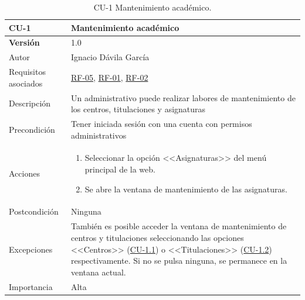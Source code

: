 \begin{table}[p]
	\centering
	\begin{tabularx}{\linewidth}{ p{} p{} }
		\toprule
		\textbf{CU-1}    & \textbf{Mantenimiento académico}\\
		\toprule
		\textbf{Versión}              & 1.0    \\
		{\small Autor}                & Ignacio Dávila García \\
		{\small Requisitos asociados} & \hyperref[itm:RF5]{RF-05}, \hyperref[itm:RF1]{RF-01}, \hyperref[itm:RF2]{RF-02} \\
		{\small Descripción}          & Un administrativo puede realizar labores de mantenimiento de los centros, titulaciones y asignaturas \\
		{\small Precondición}         & Tener iniciada sesión con una cuenta con permisos administrativos \\
		{\small Acciones}             &
		\begin{enumerate}
			\def\labelenumi{\arabic{enumi}.}
			\tightlist
			\item Seleccionar la opción <<Asignaturas>> del menú principal de la web.
			\item Se abre la ventana de mantenimiento de las asignaturas.
		\end{enumerate}\\
		{\small Postcondición}        & Ninguna \\
		{\small Excepciones}          & También es posible acceder la ventana de mantenimiento de centros y titulaciones seleccionando las opciones <<Centros>> (\hyperref[table:CU-1_1]{CU-1.1}) o <<Titulaciones>> (\hyperref[table:CU-1_2]{CU-1.2}) respectivamente. Si no se pulsa ninguna, se permanece en la ventana actual. \\
		{\small Importancia}          & Alta \\
		\bottomrule
	\end{tabularx}
	\caption{CU-1 Mantenimiento académico.}\label{table:CU-1}
\end{table}
\FloatBarrier

